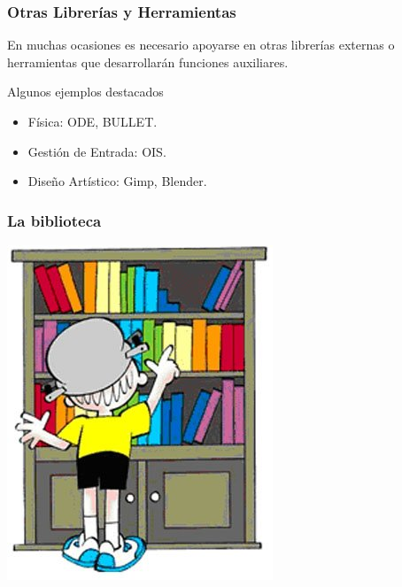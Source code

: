 
\begin{frame}
	\frametitle{Otras Librerías y Herramientas}
		
	En muchas ocasiones es necesario apoyarse en otras librerías externas o herramientas que desarrollarán funciones auxiliares.
	\newline
	\begin{block}{Algunos ejemplos destacados}
		\begin{itemize}
			\item Física: ODE, BULLET.
			\item Gestión de Entrada: OIS.
			\item Diseño Artístico: Gimp, Blender.
		\end{itemize}
	\end{block}

\end{frame}


\begin{frame}
	\frametitle{La biblioteca}
	
	\begin{center}
		\includegraphics[scale=0.50]{img/biblio.jpg}
	\end{center}

\end{frame}


